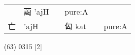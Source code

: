 \documentclass[14pt,a4paper]{scrartcl}
\begin{document}
\begin{longtable}[c]{@{}llllll@{}}
\begin{minipage}[t]{0.14\columnwidth}\raggedright\strut
\strut\end{minipage} &
\begin{minipage}[t]{0.14\columnwidth}\raggedright\strut
藹 'ajH
\strut\end{minipage} &
\begin{minipage}[t]{0.14\columnwidth}\raggedright\strut
\strut\end{minipage} &
\begin{minipage}[t]{0.14\columnwidth}\raggedright\strut
pure:A
\strut\end{minipage}\tabularnewline
\begin{minipage}[t]{0.14\columnwidth}\raggedright\strut
亡
\strut\end{minipage} &
\begin{minipage}[t]{0.14\columnwidth}\raggedright\strut
'ajH
\strut\end{minipage} &
\begin{minipage}[t]{0.14\columnwidth}\raggedright\strut
\strut\end{minipage} &
\begin{minipage}[t]{0.14\columnwidth}\raggedright\strut
匃 kat
\strut\end{minipage} &
\begin{minipage}[t]{0.14\columnwidth}\raggedright\strut
\strut\end{minipage} &
\begin{minipage}[t]{0.14\columnwidth}\raggedright\strut
pure:A
\strut\end{minipage}\tabularnewline
\bottomrule
\end{longtable}

(63) 0315 {[}2{]}
\end{document}
